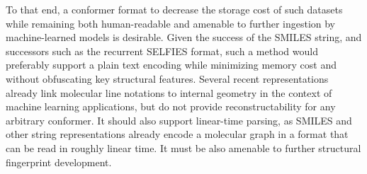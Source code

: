 \documentclass[%
 preprint,
superscriptaddress,
 amsmath,amssymb,
 aip,
 jcp,
]{revtex4-2}
\begin{document}


To that end, a conformer format to decrease the storage cost of such datasets while remaining both human-readable and amenable to further ingestion by machine-learned models is desirable.
Given the success of the SMILES string, and successors such as the recurrent SELFIES format, such a method would preferably support a plain text encoding while minimizing memory cost and without obfuscating key structural features.
Several recent representations already link molecular line notations to internal geometry in the context of machine learning applications, but do not provide reconstructability for any arbitrary conformer.\cite{Gao2024MolStrucTok,Feng2024Lingo3DMol,Furness2025CSMILES,Xiong2026ConfSeq}
It should also support linear-time parsing, as SMILES and other string representations already encode a molecular graph in a format that can be read in roughly linear time.
It must be also amenable to further structural fingerprint development.\cite{SchulzGasch2012:TFD,Axen2017:3d-fingerprint,Ballester2007:USR,Schreyer2012:USRCAT,Quintana2022:md-fingerprints,Quintana2025:bitbirch}
\end{document}
